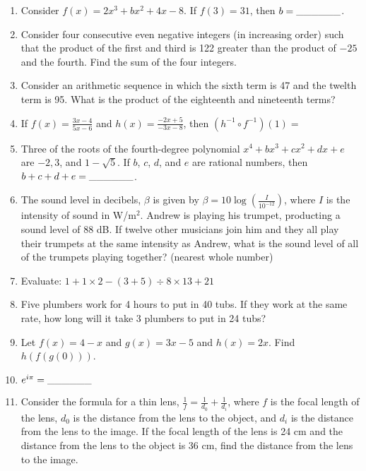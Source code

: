 \documentclass[../uilmath.tex]{subfiles}
\begin{document}
\begin{enumerate}[label=\bfseries\arabic*.]
        \item %
        Consider $f(x)=2x^3+bx^2+4x-8$. If $f(3)=31$, then $b=\_\_\_\_\_\_$.

        \item %
        Consider four consecutive even negative integers (in increasing order) such that the product of the first and third 
        is 122 greater than the product of $-25$ and the fourth. Find the sum of the four integers.

        \item %
        Consider an arithmetic sequence in which the sixth term is 47 and the twelth term is 95. What is the product of the eighteenth and nineteenth terms?

        \item %
        If $f(x)=\frac{3x-4}{5x-6}$ and $h(x)=\frac{-2x+5}{-3x-8}$, then $\left(h^{-1}\circ f^{-1}\right)(1)=$

        \item %
        Three of the roots of the fourth-degree polynomial $x^4+bx^3+cx^2+dx+e$ are $-2,3$, and $1-\sqrt{5}$. If $b$, $c$, $d$, and $e$
        are rational numbers, then $b+c+d+e=\_\_\_\_\_\_$.

        \item %
        The sound level in decibels, $\beta$ is given by $\beta = 10\log\left(\frac{I}{10^{-12}}\right)$, where $I$ is the intensity of sound in W/m$^2$.
        Andrew is playing his trumpet, producting a sound level of 88 dB. If twelve other musicians join him and they all play their trumpets at the same intensity as Andrew,
        what is the sound level of all of the trumpets playing together? (nearest whole number)

        \item %
        Evaluate: $1+1\times 2-(3+5)\div 8\times 13+21$

        \item %
        Five plumbers work for 4 hours to put in 40 tubs. If they work at the same rate, how long will it take 3 plumbers to put in 24 tubs?

        \item %
        Let $f(x)=4-x$ and $g(x)=3x-5$ and $h(x)=2x$. Find $h(f(g(0)))$.

        \item %
        $e^{i\pi}=\_\_\_\_\_\_$

        \item %
        Consider the formula for a thin lens, $\frac{1}{f}=\frac{1}{d_0}+\frac{1}{d_i}$, where $f$ is the focal length of the lens, $d_0$ is the distance from the lens to the object, and $d_i$ is the distance from the lens to the image. If the focal length of the lens is 24 cm 
        and the distance from the lens to the object is 36 cm, find the distance from the lens to the image.


\end{enumerate}
\end{document}
